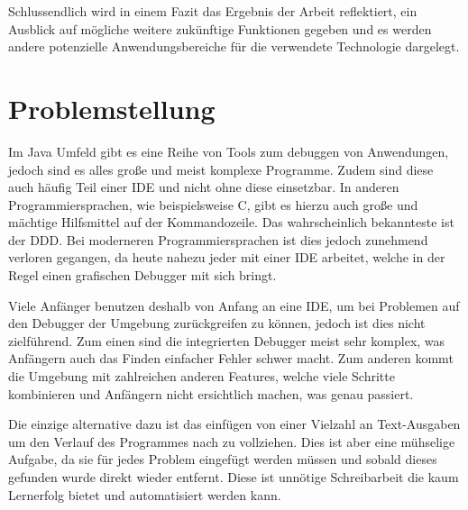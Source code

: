 Schlussendlich wird in einem Fazit das Ergebnis der Arbeit reflektiert, ein Ausblick auf mögliche weitere zukünftige Funktionen gegeben und es werden andere potenzielle Anwendungsbereiche für die verwendete Technologie dargelegt.

\section{Problemstellung} 

Im Java Umfeld gibt es eine Reihe von Tools zum debuggen von Anwendungen, jedoch sind es alles große und meist komplexe Programme. Zudem sind diese auch häufig Teil einer \ac{IDE} und nicht ohne diese einsetzbar.
In anderen Programmiersprachen, wie beispielsweise C, gibt es hierzu auch große und mächtige Hilfsmittel auf der Kommandozeile. Das wahrscheinlich bekannteste ist der \ac{DDD}. Bei moderneren Programmiersprachen ist dies jedoch zunehmend verloren gegangen, da heute nahezu jeder mit einer \ac{IDE} arbeitet, welche in der Regel einen grafischen Debugger mit sich bringt.

Viele Anfänger benutzen deshalb von Anfang an eine \ac{IDE}, um bei Problemen auf den Debugger der Umgebung zurückgreifen zu können, jedoch ist dies nicht zielführend. Zum einen sind die integrierten Debugger meist sehr komplex, was Anfängern auch das Finden einfacher Fehler schwer macht. Zum anderen kommt die Umgebung mit zahlreichen anderen Features, welche viele Schritte kombinieren und Anfängern nicht ersichtlich machen, was genau passiert.

Die einzige alternative dazu ist das einfügen von einer Vielzahl an Text-Ausgaben um den Verlauf des Programmes nach zu vollziehen. Dies ist aber eine mühselige Aufgabe, da sie für jedes Problem eingefügt werden müssen und sobald dieses gefunden wurde direkt wieder entfernt. Diese ist unnötige Schreibarbeit die kaum Lernerfolg bietet und automatisiert werden kann.



